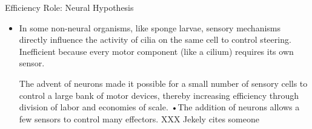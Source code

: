 \documentclass[10pt, aspectratio=169, handout]{beamer}
\begin{document}
\begin{frame}[label=efficiency_role]{Efficiency Role: Neural Hypothesis}

    \begin{itemize}
        \item 
        
 In some non-neural organisms, like sponge larvae, sensory mechanisms directly influence the activity of cilia on the same cell to control steering. Inefficient because every motor component (like a cilium) requires its own sensor.


 The advent of neurons made it possible for a small number of sensory cells to control a large bank of motor devices, thereby increasing efficiency through division of labor and economies of scale.
•The addition of neurons  allows a few sensors to control many effectors. XXX Jekely cites someone
        
      
    \end{itemize}

   

\end{frame}
\end{document}
